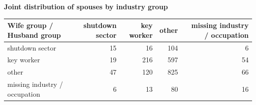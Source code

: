 \textbf{Joint distribution of spouses by industry group}\\

\begin{tabular}{lrrrr}
\toprule
Wife group / Husband group & shutdown sector & key worker & other & missing industry / occupation\\
\midrule
shutdown sector & 15 & 16 & 104 & 6\\
key worker & 19 & 216 & 597 & 54\\
other & 47 & 120 & 825 & 66\\
missing industry / occupation & 6 & 13 & 80 & 16\\
\bottomrule
\end{tabular}
